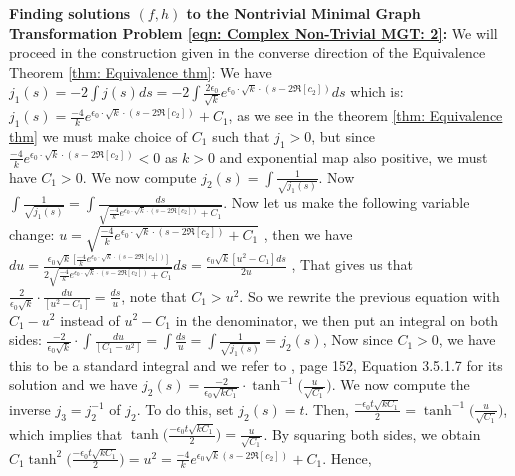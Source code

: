\documentclass[12pt]{article}
\theoremstyle{plain}
\theoremstyle{definition}
\theoremstyle{remark}
\begin{document}
\textbf{Finding solutions \((f,h)\) to the Nontrivial Minimal Graph Transformation Problem \ref{eqn: Complex Non-Trivial MGT: 2}:} We will proceed in the construction given in the converse direction of the Equivalence Theorem \ref{thm: Equivalence thm}: We have \(j_1(s)=-2\int j(s)ds=-2\int \tfrac{2\epsilon_0}{\sqrt{k}}e^{\epsilon_0\cdot\sqrt{k}\cdot(s-2\Re[c_2])} ds\) which is: \(j_1(s)=\tfrac{-4}{k}e^{\epsilon_0\cdot\sqrt{k}\cdot(s-2\Re[c_2])}+C_1\), as we see in the theorem \ref{thm: Equivalence thm} we must make choice of \(C_1\) such that \(j_1>0\), but since \(\tfrac{-4}{k}e^{\epsilon_0\cdot\sqrt{k}\cdot(s-2\Re[c_2])}<0\) as \(k>0\) and exponential map also positive, we must have \(C_1>0\).
We now compute \(j_2(s)=\int \tfrac{1}{\sqrt{j_1(s)}}\). Now \footnotesize \(\int \tfrac{1}{\sqrt{j_1(s)}}=\int \tfrac{ds}{\sqrt{\frac{-4}{k}e^{\epsilon_0\cdot\sqrt{k}\cdot(s-2\Re[c_2])}+C_1}}\)\normalsize . Now let us make the following variable change: \footnotesize \(u=\sqrt{\tfrac{-4}{k}e^{\epsilon_0\cdot\sqrt{k}\cdot(s-2\Re[c_2])}+C_1}\) \normalsize, then we have \footnotesize \(du=\frac{\epsilon_0\sqrt{k}\,\big[\frac{-4}{k}e^{\epsilon_0\cdot\sqrt{k}\cdot(s-2\Re[c_2])}\big]}{2\sqrt{\frac{-4}{k}e^{\epsilon_0\cdot\sqrt{k}\cdot(s-2\Re[c_2])}+C_1}}ds=\frac{\epsilon_0\sqrt{k}[u^2-C_1]ds}{2u}\) \normalsize, That gives us that \(\tfrac{2}{\epsilon_0\sqrt{k}}\cdot \tfrac{du}{[u^2-C_1]}=\frac{ds}{u}\), note that \(C_1>u^2\). So we rewrite the previous equation with \(C_1-u^2\) instead of \(u^2-C_1\) in the denominator, we then put an integral on both sides: \(\tfrac{-2}{\epsilon_0\sqrt{k}}\cdot \int\tfrac{du}{[C_1-u^2]}=\int\tfrac{ds}{u}=\int \frac{1}{\sqrt{j_1(s)}}=j_2(s)\), Now since \(C_1>0\), we have this to be a standard integral and we refer to \cite{JD}, page 152, Equation 3.5.1.7 for its solution and we have \(j_2(s)=\tfrac{-2}{\epsilon_0\sqrt{kC_1}}\cdot\tanh^{-1}\big(\tfrac{u}{\sqrt{C_1}}\big)\). We now compute the inverse \(j_3 = j_2^{-1}\) of \(j_2\). To do this, set \(j_2(s) = t\). Then, \(\tfrac{-\epsilon_0 t \sqrt{k C_1}}{2} = \tanh^{-1}\big(\tfrac{u}{\sqrt{C_1}}\big)\), which implies that \(\tanh\big(\tfrac{-\epsilon_0 t \sqrt{k C_1}}{2}\big) = \tfrac{u}{\sqrt{C_1}}\). By squaring both sides, we obtain \(C_1 \tanh^2\big(\tfrac{-\epsilon_0 t \sqrt{k C_1}}{2}\big) = u^2 = \tfrac{-4}{k} e^{\epsilon_0 \sqrt{k} (s - 2\Re[c_2])} + C_1\). Hence,  
\end{document}
